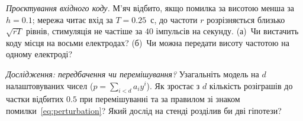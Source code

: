 \begin{exercise}[\lvlB]
\label{ex:22:6}
\emph{Проєктування вхідного коду.} М'яч відбито, якщо помилка за висотою менша за $h=0.1$; мережа читає вхід за $T=0.25$~с, до частоти $r$ розрізняється близько $\sqrt{rT}$ рівнів, стимуляція не частіше за $40$ імпульсів на секунду. (а)~Чи вистачить коду місця на восьми електродах? (б)~Чи можна передати висоту частотою на одному електроді?
\end{exercise}

\begin{exercise}[\lvlC]
\label{ex:22:7}
\emph{Дослідження: передбачення чи перемішування?} Узагальніть модель на $d$ налаштовуваних чисел ($p=\sum_{i<d}a_iy^i$). Як зростає з $d$ кількість розіграшів до частки відбитих $0.5$ при перемішуванні та за правилом зі знаком помилки~\eqref{eq:perturbation}? Який дослід на стенді розділив би дві гіпотези?
\end{exercise}
